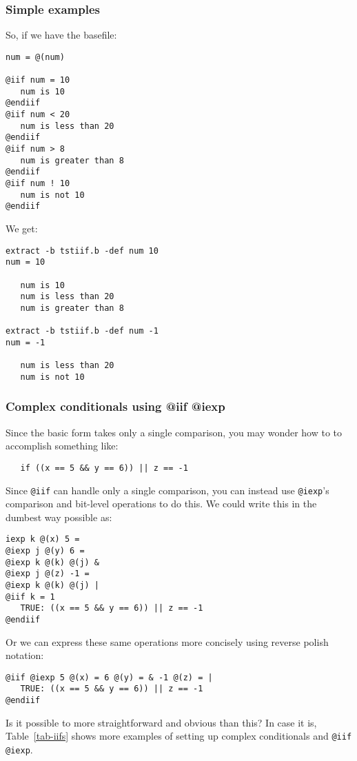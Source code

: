 \subsubsection{Simple examples}
So, if we have the basefile:
\begin{verbatim}
num = @(num)

@iif num = 10
   num is 10
@endiif
@iif num < 20
   num is less than 20
@endiif
@iif num > 8
   num is greater than 8
@endiif
@iif num ! 10
   num is not 10
@endiif
\end{verbatim}

We get:
\begin{verbatim}
extract -b tstiif.b -def num 10
num = 10

   num is 10
   num is less than 20
   num is greater than 8

extract -b tstiif.b -def num -1
num = -1

   num is less than 20
   num is not 10
\end{verbatim}

\subsubsection{Complex conditionals using @iif @iexp}
\label{sec-iexp-if}
Since the basic form takes only a single comparison, you may wonder
how to to accomplish something like:
\begin{verbatim}
   if ((x == 5 && y == 6)) || z == -1
\end{verbatim}

Since {\tt @iif} can handle only a single comparison, you can instead use
{\tt @iexp}'s comparison and bit-level operations to do this.  We could
write this in the dumbest way possible as:
\begin{verbatim}
iexp k @(x) 5 =
@iexp j @(y) 6 =
@iexp k @(k) @(j) &
@iexp j @(z) -1 =
@iexp k @(k) @(j) |
@iif k = 1
   TRUE: ((x == 5 && y == 6)) || z == -1
@endiif
\end{verbatim}

Or we can express these same operations more concisely using reverse polish
notation:
\begin{verbatim}
@iif @iexp 5 @(x) = 6 @(y) = & -1 @(z) = |
   TRUE: ((x == 5 && y == 6)) || z == -1
@endiif
\end{verbatim}
Is it possible to more straightforward and obvious than this?  
In case
it is, Table~\ref{tab-iifs} shows more examples of setting up complex
conditionals and {\tt @iif @iexp}.

